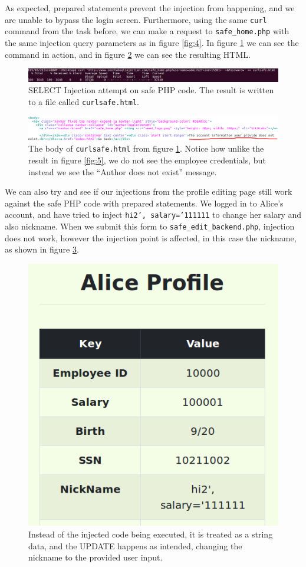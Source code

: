\documentclass[12pt,reqno]{amsart}
\newcommand{\code}[1]{\texttt{#1}}
\begin{document}
As expected, prepared statements prevent the injection from happening, and we are unable to bypass the login screen. Furthermore, using the same \code{curl} command from the task before,  we can make a request to \code{safe\_home.php} with the same injection query parameters as in figure \ref{fig:4}. In figure \ref{fig:10} we can see the command in action, and in figure \ref{fig:11} we can see the resulting HTML. 
 
\begin{figure}[h]
\includegraphics[width=\linewidth]{screenshots/SAFE_CURL_EXAMPLE_CMD.png}
\caption{SELECT Injection attempt on safe PHP code. The result is written to a file called \code{curlsafe.html}.}
\label{fig:10}
\end{figure}


\begin{figure}[h]
\includegraphics[width=\linewidth]{screenshots/SAFE_CURL_EXAMPLE_GEDIT.png}
\caption{The body of \code{curlsafe.html} from figure \ref{fig:10}. Notice how unlike the result in figure \ref{fig:5}, we do not see the employee credentials, but instead we see the ``Author does not exist'' message.}
\label{fig:11}
\end{figure}
 
We can also try and see if our injections from the profile editing page still work against the safe PHP code with prepared statements. We logged in to Alice's account, and have tried to inject \code{hi2', salary='111111} to change her salary and also nickname. When we submit this form to \code{safe\_edit\_backend.php}, injection does not work, however the injection point is affected, in this case the nickname, as shown in figure \ref{fig:12}.

\begin{figure}[h]
\includegraphics[width=0.35\linewidth]{screenshots/SQL_INJECT_ALICE_SAFE.png}
\caption{Instead of the injected code being executed, it is treated as a string data, and the UPDATE happens as intended, changing the nickname to the provided user input.}
\label{fig:12}
\end{figure}

  
\end{document}

